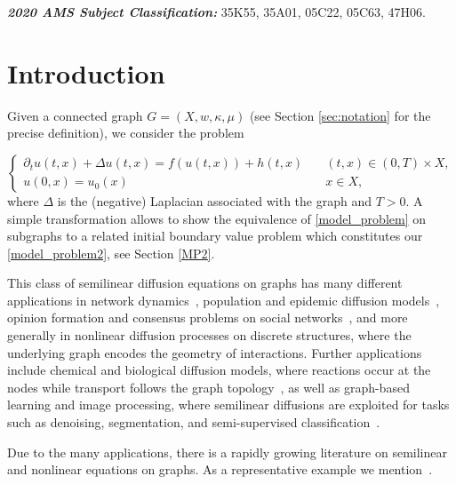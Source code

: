 \documentclass[journal]{article}
\theoremstyle{nonitalic}
\theoremstyle{nonitalic}
\theoremstyle{plain} %
\numberwithin{equation}{section}
\begin{document}
{\textbf{\textit{ 2020 AMS Subject Classification:}}
35K55, 35A01, 05C22, 05C63, 47H06.}




\section{Introduction}

Given a connected graph $G=(X,w,\kappa,\mu)$ (see Section \ref{sec:notation} for the precise definition), we consider the problem

\begin{equation}\label{model_problem}\tag*{(Model Problem 1)}
    \begin{cases}
		\partial_t u(t,x) + \Delta u(t,x) =  f(u(t,x))+h(t,x)  &   \quad (t,x) \in (0,T)\times X,\\
		u(0,x) = u_0(x) &  \quad x \in X,
	\end{cases}
	\end{equation}
where $\Delta$ is the (negative) Laplacian associated with the graph and $T>0$. A simple transformation allows to show the equivalence of \ref{model_problem} on subgraphs to a related initial boundary value problem which constitutes our \ref{model_problem2}, see Section \ref{MP2}.

 This class of semilinear diffusion equations on graphs has many different applications in 
network dynamics~\cite{proskurnikov2017tutorial,proskurnikov2018tutorial}, 
population and epidemic diffusion models~\cite{pastor2015epidemic,allen2017primer}, 
opinion formation and consensus problems on social networks~\cite{acemouglu2013opinion}, 
and more generally in nonlinear diffusion processes on discrete structures, where the underlying graph encodes the geometry of interactions. 
Further applications include chemical and biological diffusion models, where reactions occur at the nodes while transport follows the graph topology~\cite{van2009stochastic,mckay2014stochastic}, 
as well as graph-based learning and image processing, where semilinear diffusions are exploited for tasks such as denoising, segmentation, and semi-supervised classification~\cite{bertozzi2012diffuse,elmoataz2008nonlocal}. 

Due to  the many   applications, there is a rapidly growing literature on semilinear and nonlinear equations on graphs. As a representative example we mention~\cite{bianchi2022generalized,ma2022porous, GLY16a, grigor2016yamabe, HX23, LSZ23, LY21,  KS18,HM15,monticelli2025nonexistence}.
\end{document}
